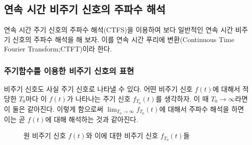 \subsection{연속 시간 비주기 신호의 주파수 해석}
연속 시간 주기 신호의 주파수 해석(CTFS)을 이용하여 보다 일반적인 연속 시간 비주기 신호의 주파수 해석을 해 보자.
이를 연속 시간 푸리에 변환(Continuous Time Fourier Transform;CTFT)이라 한다.
\subsubsection{주기함수를 이용한 비주기 신호의 표현}
비주기 신호도 사실 주기 신호로 나타낼 수 있다. 어떤 비주기 신호 $f(t)$에 대해서 적당한 $T_0$마다 이 $f(t)$가 나타나는 주기 신호 $f_{T_0}(t)$를 생각하자.
이 때 $T_0\rightarrow \infty$라면 이 둘은 같아진다. 이렇게 함으로써 $\lim_{T_0\rightarrow \infty} f_{T_0}(t)$에 대해서 주파수 해석을 하면 이는 곧 $f(t)$에 대해 해석하는 것과 같아진다.
\begin{figure}
    \centering
    \caption{원 비주기 신호 $f(t)$와 이에 대한 비주기 신호 $f_{T_0}(t)$들}
\end{figure}
